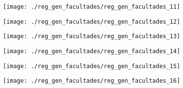 \begin{figure}[!ht]
    \centering
    \texttt{[image: ./reg\_gen\_facultades/reg\_gen\_facultades\_11]}
\end{figure}
\clearpage

\begin{figure}[!ht]
    \centering
    \texttt{[image: ./reg\_gen\_facultades/reg\_gen\_facultades\_12]}
\end{figure}
\clearpage

\begin{figure}[!ht]
    \centering
    \texttt{[image: ./reg\_gen\_facultades/reg\_gen\_facultades\_13]}
\end{figure}
\clearpage

\begin{figure}[!ht]
    \centering
    \texttt{[image: ./reg\_gen\_facultades/reg\_gen\_facultades\_14]}
\end{figure}
\clearpage

\begin{figure}[!ht]
    \centering
    \texttt{[image: ./reg\_gen\_facultades/reg\_gen\_facultades\_15]}
\end{figure}
\clearpage

\begin{figure}[!ht]
    \centering
    \texttt{[image: ./reg\_gen\_facultades/reg\_gen\_facultades\_16]}
\end{figure}
\clearpage
